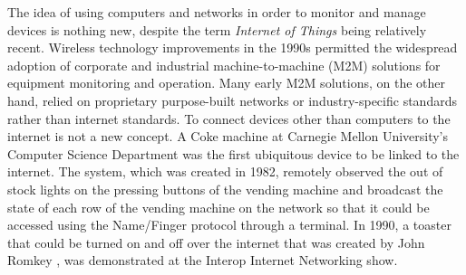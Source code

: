 The idea of using computers and networks in order to monitor and manage
devices is nothing new, despite the term \textit{Internet of Things} being
relatively recent.
Wireless technology improvements in the 1990s permitted the widespread
adoption of corporate and industrial machine-to-machine (M2M) solutions
for equipment monitoring and operation. Many early M2M solutions, on the
other hand, relied on proprietary purpose-built networks or industry-specific
standards rather than internet standards. To connect devices other than
computers to the internet is not a new concept. A Coke machine at Carnegie
Mellon University's Computer Science Department \cite{EverhartInteresting}
was the first ubiquitous device to be linked to the internet. The system,
which was created in 1982, remotely observed the out of stock lights on
the pressing buttons of the vending machine and broadcast the state of each
row of the vending machine on the network so that it could be accessed using
the Name/Finger protocol through a terminal. In 1990, a toaster that could
be turned on and off over the internet that was created by John Romkey \cite{RomkeyToast},
was demonstrated at the Interop Internet Networking show.


